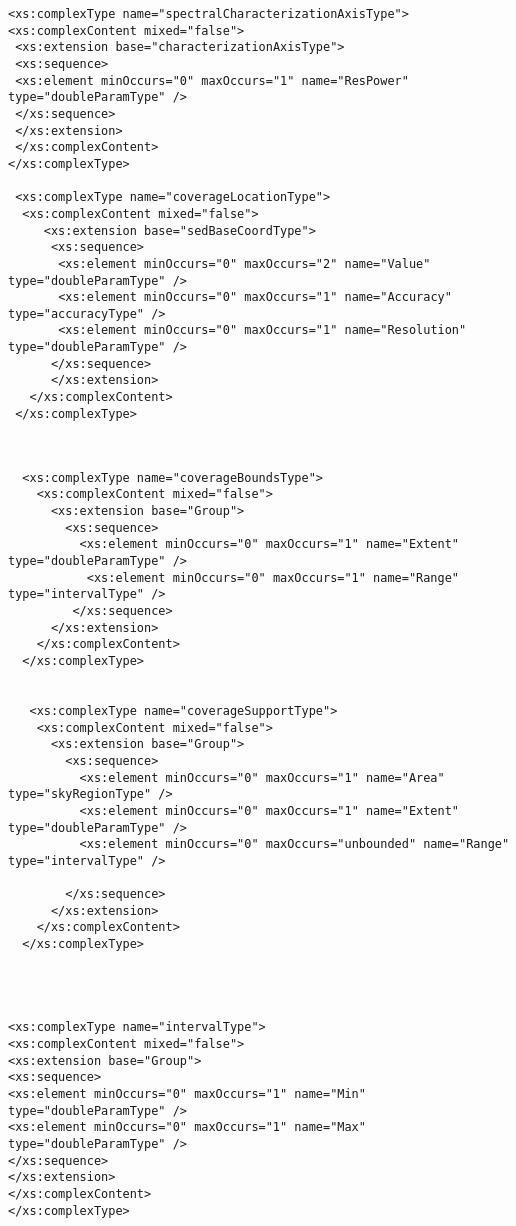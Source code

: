 {\begin{flushleft}
\begin{fmppage}
\begin{verbatim}
<xs:complexType name="spectralCharacterizationAxisType">
<xs:complexContent mixed="false">
 <xs:extension base="characterizationAxisType">
 <xs:sequence>
 <xs:element minOccurs="0" maxOccurs="1" name="ResPower" type="doubleParamType" /> 
 </xs:sequence>
 </xs:extension>
 </xs:complexContent>
</xs:complexType>

 <xs:complexType name="coverageLocationType">
  <xs:complexContent mixed="false">
     <xs:extension base="sedBaseCoordType">
      <xs:sequence>
       <xs:element minOccurs="0" maxOccurs="2" name="Value" type="doubleParamType" />
       <xs:element minOccurs="0" maxOccurs="1" name="Accuracy" type="accuracyType" />
       <xs:element minOccurs="0" maxOccurs="1" name="Resolution" type="doubleParamType" />
      </xs:sequence>
      </xs:extension>
   </xs:complexContent>
 </xs:complexType>


\end{verbatim}
\end{fmppage}

\begin{fmppage}
\begin{verbatim}

  <xs:complexType name="coverageBoundsType">
    <xs:complexContent mixed="false">
      <xs:extension base="Group">
        <xs:sequence>
          <xs:element minOccurs="0" maxOccurs="1" name="Extent" type="doubleParamType" />
           <xs:element minOccurs="0" maxOccurs="1" name="Range" type="intervalType" />
         </xs:sequence>
      </xs:extension>
    </xs:complexContent>
  </xs:complexType>


   <xs:complexType name="coverageSupportType">
    <xs:complexContent mixed="false">
      <xs:extension base="Group">
        <xs:sequence>
          <xs:element minOccurs="0" maxOccurs="1" name="Area" type="skyRegionType" />
          <xs:element minOccurs="0" maxOccurs="1" name="Extent" type="doubleParamType" />
          <xs:element minOccurs="0" maxOccurs="unbounded" name="Range" type="intervalType" />

        </xs:sequence>
      </xs:extension>
    </xs:complexContent>
  </xs:complexType>




<xs:complexType name="intervalType">
<xs:complexContent mixed="false">
<xs:extension base="Group">
<xs:sequence>
<xs:element minOccurs="0" maxOccurs="1" name="Min" type="doubleParamType" />
<xs:element minOccurs="0" maxOccurs="1" name="Max" type="doubleParamType" />
</xs:sequence>
</xs:extension>
</xs:complexContent>
</xs:complexType>


\end{verbatim}
\end{fmppage}
\end{flushleft}}
